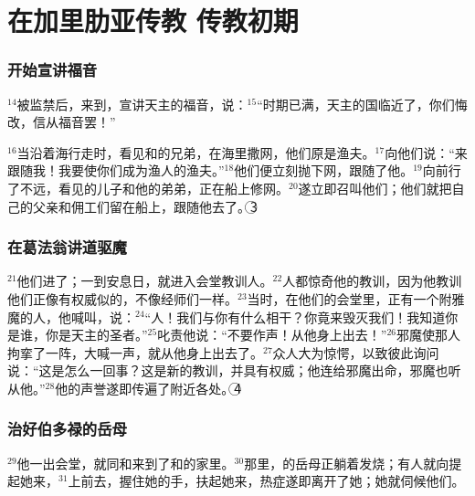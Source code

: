 \section*{在加里肋亚传教 传教初期}


\subsubsection{开始宣讲福音}
$^{14}$\UL[若翰]被监禁后，\UL[耶稣]来到\UL[加里肋亚]，宣讲天主的福音，说：$^{15}$“时期已满，天主的国临近了，你们悔改，信从福音罢！”

$^{16}$当\UL[耶稣]沿着\UL[加里肋亚]海行走时，看见\UL[西满]和\UL[西满]的兄弟\UL[安德肋]，在海里撒网，他们原是渔夫。$^{17}$\UL[耶稣]向他们说：“来跟随我！我要使你们成为渔人的渔夫。”$^{18}$他们便立刻抛下网，跟随了他。$^{19}$\UL[耶稣]向前行了不远，看见\UL[载伯德]的儿子\UL[雅各伯]和他的弟弟\UL[若望]，正在船上修网。$^{20}$\UL[耶稣]遂立即召叫他们；他们就把自己的父亲\UL[载伯德]和佣工们留在船上，跟随他去了。\textcircled{3}


\subsubsection{在葛法翁讲道驱魔}
$^{21}$他们进了\UL[葛法翁]；一到安息日，\UL[耶稣]就进入会堂教训人。$^{22}$人都惊奇他的教训，因为他教训他们正像有权威似的，不像经师们一样。$^{23}$当时，在他们的会堂里，正有一个附雅魔的人，他喊叫，说：$^{24}$“\UL[纳匝肋]人\UL[耶稣]！我们与你有什么相干？你竟来毁灭我们！我知道你是谁，你是天主的圣者。”$^{25}$\UL[耶稣]叱责他说：“不要作声！从他身上出去！”$^{26}$邪魔使那人拘挛了一阵，大喊一声，就从他身上出去了。$^{27}$众人大为惊愕，以致彼此询问说：“这是怎么一回事？这是新的教训，并具有权威；他连给邪魔出命，邪魔也听从他。”$^{28}$他的声誉遂即传遍了\UL[加里肋亚]附近各处。\textcircled{4}


\subsubsection{治好伯多禄的岳母}
$^{29}$他一出会堂，就同\UL[雅各伯]和\UL[若望]来到了\UL[西满]和\UL[安德肋]的家里。$^{30}$那里，\UL[西满]的岳母正躺着发烧；有人就向\UL[耶稣]提起她来，$^{31}$\UL[耶稣]上前去，握住她的手，扶起她来，热症遂即离开了她；她就伺候他们。


